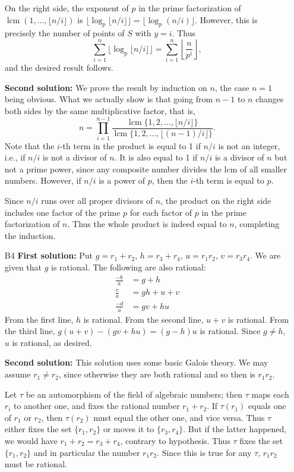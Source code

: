 \documentclass[amssymb,twocolumn,pra,10pt,aps]{revtex4-1}
\DeclareMathOperator{\lcm}{lcm}
\begin{document}
\begin{itemize}
On the right side, the exponent of $p$ in the prime factorization of $\lcm(1,
\dots, \lfloor n/i \rfloor)$ is $\lfloor \log_p \lfloor n/i \rfloor \rfloor
= \lfloor \log_p (n/i) \rfloor$.  However, this is precisely the number
of points of $S$ with $y=i$. Thus
\[
\sum_{i=1}^n
\lfloor \log_p \lfloor n/i \rfloor \rfloor
= \sum_{i =1}^n \left\lfloor \frac{n}{p^i} \right\rfloor,
\]
and the desired result follows.

\textbf{Second solution:}
We prove the result by induction on $n$, the case $n=1$ being obvious.
What we actually show is that going from $n-1$ to $n$ changes both
sides by the same multiplicative factor, that is,
\[
n = \prod_{i=1}^{n-1} \frac{\lcm\{1, 2, \dots, \lfloor n/i \rfloor\}}{\lcm
\{1, 2, \dots, \lfloor (n-1)/i \rfloor\}}.
\]
Note that the $i$-th term in the product is equal to 1 if $n/i$ is not
an integer, i.e., if $n/i$ is not a divisor of $n$.
It is also equal to 1 if $n/i$ is a divisor of $n$ but not a prime power,
since any composite number divides the lcm of all smaller numbers.
However, if $n/i$ is a power of $p$, then the $i$-th term is equal to $p$.

Since $n/i$ runs over all proper divisors of $n$, the product on the right
side includes one factor of the prime $p$
for each factor of $p$ in the prime factorization of $n$. Thus the whole
product is indeed equal to $n$, completing the induction.

\item[B4]
\textbf{First solution:}
Put $g = r_1 + r_2$, $h = r_3 + r_4$, $u = r_1r_2$, $v = r_3r_4$.
We are given that $g$ is rational. The following are also rational:
\begin{align*}
\frac{-b}{a} &= g+h \\
\frac{c}{a} &= gh + u + v \\
\frac{-d}{a} &= gv + hu
\end{align*}
From the first line, $h$ is rational. From the second line, $u+v$
is rational. From the third line, $g(u+v) - (gv+hu) =
(g-h)u$ is rational. Since $g \neq h$, $u$ is rational, as desired.

\textbf{Second solution:} This solution uses some basic
Galois theory. We may assume $r_1 \neq r_2$, since otherwise they are both
rational and so then is $r_1r_2$.

Let $\tau$ be an automorphism of the field of algebraic numbers; then $\tau$
maps each $r_i$ to another one, and fixes the rational number $r_1 + r_2$.
If $\tau(r_1)$ equals one of $r_1$ or $r_2$, then $\tau(r_2)$ must equal
the other one, and vice versa.  Thus $\tau$ either fixes the set $\{r_1,
r_2\}$ or moves it to $\{r_3, r_4\}$. But if the latter happened, we would
have $r_1 +r_2 = r_3+r_4$, contrary to hypothesis.  Thus $\tau$ fixes the
set $\{r_1, r_2\}$ and in particular the number $r_1r_2$. Since this is
true for any $\tau$, $r_1r_2$ must be rational.


\end{itemize}
\end{document}
